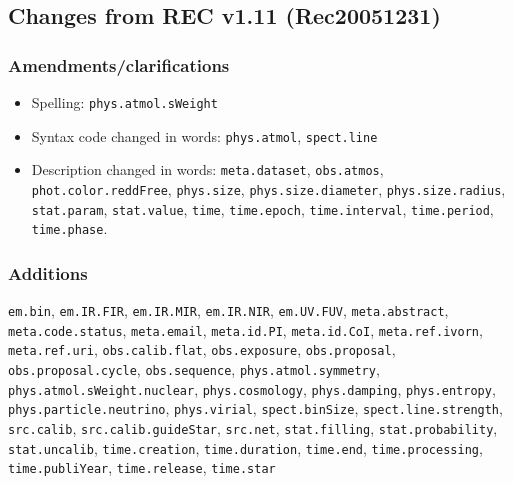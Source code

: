 \documentclass[11pt,a4paper]{ivoa}
\begin{document}
\subsection{Changes from REC v1.11 (Rec20051231)}
\subsubsection*{Amendments/clarifications}
\begin{itemize}
\item Spelling: {\tt phys.atmol.sWeight}
\item Syntax code changed in words: {\tt phys.atmol}, {\tt spect.line}
\item \begin{flushleft}
Description changed in words: 
{\tt meta.dataset}, {\tt obs.atmos}, {\tt phot.color.reddFree}, 
{\tt phys.size}, {\tt phys.size.diameter}, {\tt phys.size.radius}, {\tt stat.param}, {\tt stat.value}, 
{\tt time}, {\tt time.epoch}, {\tt time.interval}, {\tt time.period}, {\tt time.phase}.
\end{flushleft}
\end{itemize}

\subsubsection*{Additions}
\begin{flushleft}
{\tt em.bin}, {\tt em.IR.FIR}, {\tt em.IR.MIR}, {\tt em.IR.NIR}, {\tt em.UV.FUV}, 
{\tt meta.abstract}, {\tt meta.code.status}, {\tt meta.email}, {\tt meta.id.PI}, {\tt meta.id.CoI}, 
{\tt meta.ref.ivorn}, {\tt meta.ref.uri}, {\tt obs.calib.flat}, {\tt obs.exposure}, {\tt obs.proposal}, 
{\tt obs.proposal.cycle}, {\tt obs.sequence}, {\tt phys.atmol.symmetry}, {\tt phys.atmol.sWeight.nuclear}, 
{\tt phys.cosmology}, {\tt phys.damping}, {\tt phys.entropy}, {\tt phys.particle.neutrino}, {\tt phys.virial}, {\tt spect.binSize},
{\tt spect.line.strength}, {\tt src.calib}, {\tt src.calib.guideStar}, {\tt src.net}, {\tt stat.filling}, 
{\tt stat.probability}, {\tt stat.uncalib}, {\tt time.creation}, {\tt time.duration}, {\tt time.end}, 
{\tt time.processing}, {\tt time.publiYear}, {\tt time.release}, {\tt time.star}
\end{flushleft}
\end{document}

